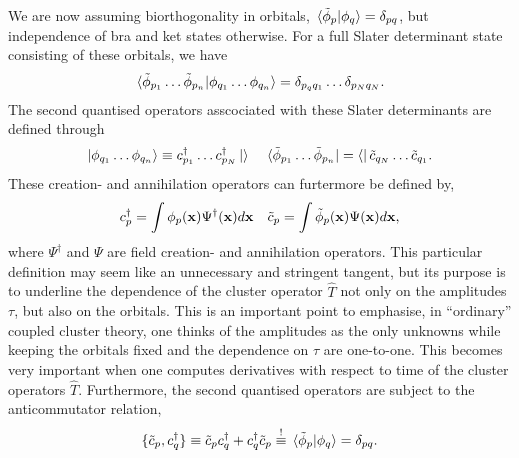 We are now assuming biorthogonality in orbitals, $\braket*{\tilde{\phi}_p}{\phi_q} = \delta_{pq}$, but 
independence of bra and ket states otherwise. For a full Slater determinant state 
consisting of these orbitals, we have 
\begin{equation}
    \braket*{\tilde{\phi}_{p_1}\dots \tilde{\phi}_{p_n}}{\phi_{q_1}\dots\phi_{q_n}}
    =\delta_{p_q q_1}\dots \delta_{p_N q_N}.
\end{equation}
The second quantised operators asscociated with these Slater determinants are defined through
\begin{equation}
    \ket{\phi_{q_1}\dots\phi_{q_n}} \equiv c^\dagger_{p_1}\dots c^\dagger_{p_N}\ket{ }
    \quad
    \bra*{\tilde{\phi}_{p_1}\dots \tilde{\phi}_{p_n}} = \bra{ } \tilde{c}_{q_N} \dots \tilde{c}_{q_1}.
\end{equation}
These creation- and annihilation operators can furtermore be defined by,
\begin{equation}
    c_p^\dagger = \int \phi_p(\vb{x}) \Psi^\dagger(\vb{x})d\vb{x}
    \quad
    \tilde{c}_p = \int \tilde{\phi}_p(\vb{x}) \Psi(\vb{x})d\vb{x},
\end{equation}
where $\Psi^\dagger$ and $\Psi$ are field creation- and annihilation operators. This particular
definition may seem like an unnecessary and stringent tangent, but its purpose is to underline
the dependence of the cluster operator $\hat{T}$ not only on the amplitudes
$\tau$, but also on the orbitals. This is an important point to emphasise, in ``ordinary''
coupled cluster theory, one thinks of the amplitudes as the only unknowns while keeping the 
orbitals fixed and the dependence on $\tau$ are one-to-one. This becomes very important when one computes derivatives with 
respect to time of the cluster operators $\hat{T}$.
Furthermore, the second quantised operators are subject to the anticommutator relation,
\begin{equation}
    \{\tilde{c}_p, c_q^\dagger \} \equiv \tilde{c}_p c_q^\dagger + c_q^\dagger\tilde{c}_p
    \stackrel{!}{\equiv} \braket*{\tilde{\phi}_p}{\phi_q} = \delta_{pq}.
\end{equation}

